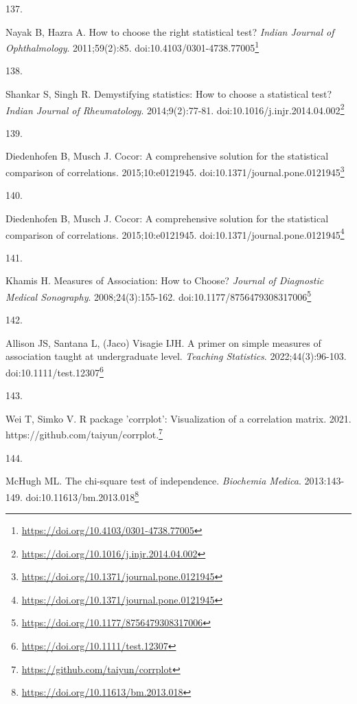 \documentclass[
  a4paper,
]{book}
\newlength{\cslhangindent}
\newlength{\csllabelwidth}
\newlength{\cslentryspacingunit} %
\newenvironment{CSLReferences}[2] %
 {%
  \setlength{\parindent}{0pt}
  \ifodd #1
  \let\oldpar\par
  \def\par{\hangindent=\cslhangindent\oldpar}
  \fi
  \setlength{\parskip}{#2\cslentryspacingunit}
 }%
 {}
\newcommand{\CSLLeftMargin}[1]{\parbox[t]{\csllabelwidth}{#1}}
\newcommand{\CSLRightInline}[1]{\parbox[t]{\linewidth - \csllabelwidth}{#1}\break}
\renewcommand{\href}[2]{#2\footnote{\url{#1}}}
\begin{document}
\begin{CSLReferences}{0}{0}
\leavevmode{}%
\CSLLeftMargin{137. }%
\CSLRightInline{Nayak B, Hazra A. How to choose the right statistical test? \emph{Indian Journal of Ophthalmology}. 2011;59(2):85. doi:\href{https://doi.org/10.4103/0301-4738.77005}{10.4103/0301-4738.77005}}

\leavevmode{}%
\CSLLeftMargin{138. }%
\CSLRightInline{Shankar S, Singh R. Demystifying statistics: How to choose a statistical test? \emph{Indian Journal of Rheumatology}. 2014;9(2):77-81. doi:\href{https://doi.org/10.1016/j.injr.2014.04.002}{10.1016/j.injr.2014.04.002}}

\leavevmode{}%
\CSLLeftMargin{139. }%
\CSLRightInline{Diedenhofen B, Musch J. Cocor: A comprehensive solution for the statistical comparison of correlations. 2015;10:e0121945. doi:\href{https://doi.org/10.1371/journal.pone.0121945}{10.1371/journal.pone.0121945}}

\leavevmode{}%
\CSLLeftMargin{140. }%
\CSLRightInline{Diedenhofen B, Musch J. Cocor: A comprehensive solution for the statistical comparison of correlations. 2015;10:e0121945. doi:\href{https://doi.org/10.1371/journal.pone.0121945}{10.1371/journal.pone.0121945}}

\leavevmode{}%
\CSLLeftMargin{141. }%
\CSLRightInline{Khamis H. Measures of Association: How to Choose? \emph{Journal of Diagnostic Medical Sonography}. 2008;24(3):155-162. doi:\href{https://doi.org/10.1177/8756479308317006}{10.1177/8756479308317006}}

\leavevmode{}%
\CSLLeftMargin{142. }%
\CSLRightInline{Allison JS, Santana L, (Jaco) Visagie IJH. A primer on simple measures of association taught at undergraduate level. \emph{Teaching Statistics}. 2022;44(3):96-103. doi:\href{https://doi.org/10.1111/test.12307}{10.1111/test.12307}}

\leavevmode{}%
\CSLLeftMargin{143. }%
\CSLRightInline{Wei T, Simko V. R package 'corrplot': Visualization of a correlation matrix. 2021. \href{https://github.com/taiyun/corrplot}{https://github.com/taiyun/corrplot.}}

\leavevmode{}%
\CSLLeftMargin{144. }%
\CSLRightInline{McHugh ML. The chi-square test of independence. \emph{Biochemia Medica}. 2013:143-149. doi:\href{https://doi.org/10.11613/bm.2013.018}{10.11613/bm.2013.018}}


\end{CSLReferences}
\end{document}
